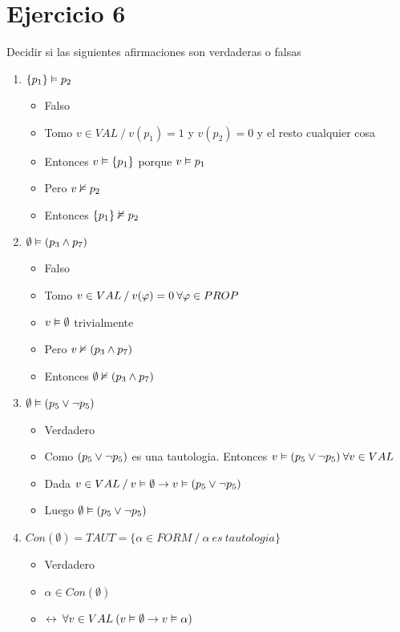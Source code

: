 \documentclass[14pt,a4paper,fleqn]{article}
\begin{document}
\newpage
\section*{Ejercicio 6}
Decidir si las siguientes afirmaciones son verdaderas o falsas\\
\begin{enumerate}
	\item $\{p_{1}\} \vDash p_{2}$
	\begin{itemize}
		\item Falso
		\item Tomo $v \in VAL \: / \: v(p_{1}) = 1 $ y $v(p_{2}) = 0$ y el resto cualquier cosa
		\item Entonces $v \vDash \{p_{1}\} $ porque $v \vDash p_{1}$
		\item Pero $v \nvDash p_{2}$
		\item Entonces $\{p_{1}\} \nvDash p_{2}$ 
	\end{itemize}
	\item $ \emptyset \vDash (p_{3} \wedge p_{7}) $
	\begin{itemize}
		\item Falso
		\item Tomo $v \in VAL  \: / \: v(\varphi) = 0 \: \forall \varphi \in PROP $
		\item $v \vDash \emptyset $ trivialmente
		\item Pero $v \nvDash ( p_{3} \wedge p_{7})$
		\item Entonces $\emptyset \nvDash (p_{3} \wedge p_7)$
	\end{itemize}
	\item $ \emptyset \vDash (p_{5} \vee \neg p_{5})$
	\begin{itemize}
		\item Verdadero
		\item Como $(p_5 \vee \neg p_5)$ es una tautologia. Entonces $ v \vDash (p_5 \vee \neg p_5) \: \forall v \in VAL $
		\item Dada $v \in VAL  \: / \: v \vDash \emptyset  \rightarrow v \vDash ( p_5 \vee \neg p_5 )$
		\item Luego $ \emptyset \vDash (p_{5} \vee \neg p_{5}) $
	\end{itemize}
	\item $ Con(\emptyset) = TAUT = \{ \alpha \in FORM \: / \: \alpha \: es \: tautologia \}$
	\begin{itemize}
		\item Verdadero
		\item $\alpha \in Con(\emptyset) $
		\item $\leftrightarrow \: \forall v \in VAL  \: (v \vDash \emptyset \rightarrow v \vDash \alpha)$

\end{itemize}
\end{enumerate}
\end{document}
